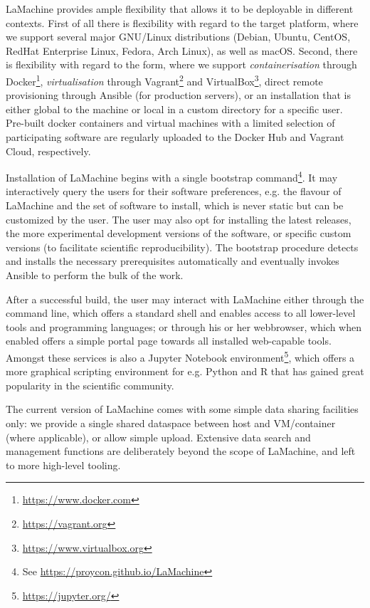 \documentclass[a4paper,11pt]{article}
\begin{document}
LaMachine provides ample flexibility that allows it to be deployable in different contexts. First of all there is
flexibility with regard to the target platform, where we support several major GNU/Linux distributions (Debian, Ubuntu,
CentOS, RedHat Enterprise Linux, Fedora, Arch Linux), as well as macOS. Second, there is flexibility with
regard to the form, where we support \emph{containerisation} through Docker\footnote{\url{https://www.docker.com}},
\emph{virtualisation} through Vagrant\footnote{\url{https://vagrant.org}} and VirtualBox\footnote{\url{https://www.virtualbox.org}},
direct remote provisioning through Ansible (for production servers), or an installation that is either global to the
machine or local in a custom directory for a specific user. Pre-built docker containers and virtual machines with a
limited selection of participating software are regularly uploaded to the Docker Hub and Vagrant Cloud, respectively.

Installation of LaMachine begins with a single bootstrap command\footnote{See
\url{https://proycon.github.io/LaMachine}}.  It may interactively query the users for their software preferences, e.g.
the flavour of LaMachine and the set of software to install, which is never static but can be customized by the user.
The user may also opt for installing the latest releases, the more experimental development versions of the software, or
specific custom versions (to facilitate scientific reproducibility). The bootstrap procedure detects and installs
the necessary prerequisites automatically and eventually invokes Ansible to perform the bulk of the work.

After a successful build, the user may interact with LaMachine either through the command line, which offers a standard
shell and enables access to all lower-level tools and programming languages; or through his or her webbrowser, which
when enabled offers a simple portal page towards all installed web-capable tools. Amongst these services is also a
Jupyter Notebook environment\footnote{\url{https://jupyter.org/}}, which offers a more graphical scripting environment
for e.g. Python and R that has gained great popularity in the scientific community.

The current version of LaMachine comes with some simple data sharing facilities only: we provide a
single shared dataspace between host and VM/container (where applicable), or allow simple upload. Extensive data
search and management functions are deliberately beyond the scope of LaMachine, and left to more high-level tooling.
\end{document}
